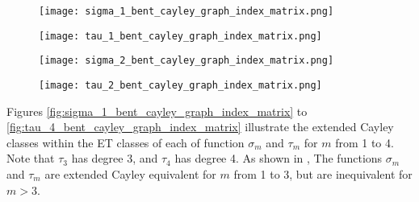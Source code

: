 \begin{figure}[!ht]
\centering
\begin{minipage}{.48\textwidth}
  \centering
  \texttt{[image: sigma\_1\_bent\_cayley\_graph\_index\_matrix.png]}
  \label{fig:sigma_1_bent_cayley_graph_index_matrix}
\end{minipage}%
\begin{minipage}{.48\textwidth}
  \centering
  \texttt{[image: tau\_1\_bent\_cayley\_graph\_index\_matrix.png]}
  \label{fig:tau_1_bent_cayley_graph_index_matrix}
\end{minipage}
\end{figure}

\begin{figure}[!hb]
\centering
\begin{minipage}{.48\textwidth}
  \centering
  \texttt{[image: sigma\_2\_bent\_cayley\_graph\_index\_matrix.png]}
  \label{fig:sigma_2_bent_cayley_graph_index_matrix}
\end{minipage}%
\begin{minipage}{.48\textwidth}
  \centering
  \texttt{[image: tau\_2\_bent\_cayley\_graph\_index\_matrix.png]}
  \label{fig:tau_2_bent_cayley_graph_index_matrix}
\end{minipage}
\end{figure}

Figures \ref{fig:sigma_1_bent_cayley_graph_index_matrix} to \ref{fig:tau_4_bent_cayley_graph_index_matrix}
illustrate the extended Cayley classes within the ET classes of each of function $\sigma_m$ and $\tau_m$ for $m$ from 1 to 4.
Note that $\tau_3$ has degree 3, and $\tau_4$ has degree 4.
As shown in \cite{Leo17Hurwitz},
The functions $\sigma_m$ and $\tau_m$ are extended Cayley equivalent for $m$ from 1 to 3, but are inequivalent for $m>3$.

